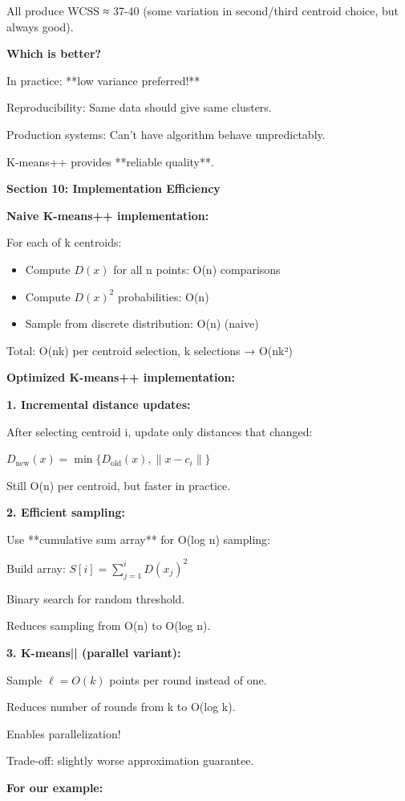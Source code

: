 \documentclass[12pt]{article}
\begin{document}
\begin{explanation}
All produce WCSS ≈ 37-40 (some variation in second/third centroid choice, but always good).

\textbf{Which is better?}

In practice: **low variance preferred!**

Reproducibility: Same data should give same clusters.

Production systems: Can't have algorithm behave unpredictably.

K-means++ provides **reliable quality**.

\textbf{Section 10: Implementation Efficiency}

\textbf{Naive K-means++ implementation:}

For each of k centroids:
\begin{itemize}
    \item Compute $D(x)$ for all n points: O(n) comparisons
    \item Compute $D(x)^2$ probabilities: O(n)
    \item Sample from discrete distribution: O(n) (naive)
\end{itemize}

Total: O(nk) per centroid selection, k selections → O(nk²)

\textbf{Optimized K-means++ implementation:}

\textbf{1. Incremental distance updates:}

After selecting centroid i, update only distances that changed:

$D_{\text{new}}(x) = \min\{D_{\text{old}}(x), \|x - c_i\|\}$

Still O(n) per centroid, but faster in practice.

\textbf{2. Efficient sampling:}

Use **cumulative sum array** for O(log n) sampling:

Build array: $S[i] = \sum_{j=1}^i D(x_j)^2$

Binary search for random threshold.

Reduces sampling from O(n) to O(log n).

\textbf{3. K-means|| (parallel variant):}

Sample $\ell = O(k)$ points per round instead of one.

Reduces number of rounds from k to O(log k).

Enables parallelization!

Trade-off: slightly worse approximation guarantee.

\textbf{For our example:}


\end{explanation}
\end{document}
